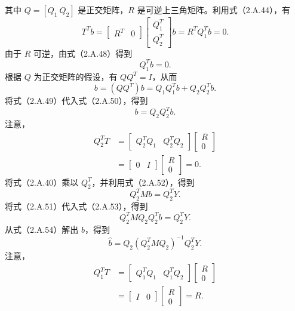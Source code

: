 其中 $Q=[Q_1\ Q_2]$ 是正交矩阵，$R$ 是可逆上三角矩阵。利用式（2.A.44），有
\begin{equation}
T^Tb=\begin{bmatrix}R^T&0\end{bmatrix}
 \begin{bmatrix}Q_1^T\\Q_2^T\end{bmatrix}b
 =R^TQ_1^Tb=0.\tag{2.A.48}
\end{equation}
由于 $R$ 可逆，由式（2.A.48）得到
\begin{equation}
Q_1^Tb=0.\tag{2.A.49}
\end{equation}
根据 $Q$ 为正交矩阵的假设，有 $QQ^T=I$，从而
\begin{equation}
b=(QQ^T)b=Q_1Q_1^Tb+Q_2Q_2^Tb.\tag{2.A.50}
\end{equation}
将式（2.A.49）代入式（2.A.50），得到
\begin{equation}
b=Q_2Q_2^Tb.\tag{2.A.51}
\end{equation}
注意，
\begin{equation}
\begin{aligned}
Q_2^TT&=\begin{bmatrix}Q_2^TQ_1&Q_2^TQ_2\end{bmatrix}
 \begin{bmatrix}R\\0\end{bmatrix}\\
 &=\begin{bmatrix}0&I\end{bmatrix}\begin{bmatrix}R\\0\end{bmatrix}=0.
\end{aligned}\tag{2.A.52}
\end{equation}
将式（2.A.40）乘以 $Q_2^T$，并利用式（2.A.52），得到
\begin{equation}
Q_2^TMb=Q_2^TY.\tag{2.A.53}
\end{equation}
将式（2.A.51）代入式（2.A.53），得到
\begin{equation}
Q_2^TMQ_2Q_2^Tb=Q_2^TY.\tag{2.A.54}
\end{equation}
从式（2.A.54）解出 $b$，得到
\begin{equation}
\widehat b=Q_2(Q_2^TMQ_2)^{-1}Q_2^TY.\tag{2.A.55}
\end{equation}
注意，
\begin{equation}
\begin{aligned}
Q_1^TT&=\begin{bmatrix}Q_1^TQ_1&Q_1^TQ_2\end{bmatrix}
 \begin{bmatrix}R\\0\end{bmatrix}\\
 &=\begin{bmatrix}I&0\end{bmatrix}\begin{bmatrix}R\\0\end{bmatrix}=R.
\end{aligned}\tag{2.A.56}
\end{equation}
